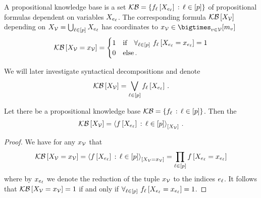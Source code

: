\begin{definition}
    A propositional knowledge base is a set $\mathcal{KB}=\{f_{\ell}\left[X_{e_{\ell}}\right] \,:\, \ell\in[p]\}$ of propositional formulas dependent on variables $X_{e_{\ell}}$.
    The corresponding formula $\mathcal{KB}\left[X_{\mathcal{V}}\right]$ depending on $X_{\mathcal{V}}=\bigcup_{\ell\in[p]}X_{e_{\ell}}$ has coordinates to $\catindexof{\nodes}\in\bigtimes_{\nodein}\catstatesof{\node}$
    \begin{align*}
        \mathcal{KB}\left[X_{\mathcal{V}}=x_{\mathcal{V}}\right]
        = \begin{cases}
              1 & \text{if}\quad \forall_{\ell\in[p]} \,\, {f_{\ell}\left[X_{e_{\ell}}=x_{e_{\ell}}\right]=1}\\
              0 & \text{else} \, .
        \end{cases}
    \end{align*}
\end{definition}

We will later investigate syntactical decompositions and denote
\begin{align*}
    \mathcal{KB}\left[X_{\mathcal{V}}\right]
    = \bigvee_{\ell\in[p]} f_{\ell}\left[X_{e_{\ell}}\right] \, .
\end{align*}


\begin{theorem}
    Let there be a propositional knowledge base $\mathcal{KB}=\{f_{\ell}\,:\,\ell\in[p]\}$.
    Then the
    \begin{align*}
        \mathcal{KB}\left[X_{\mathcal{V}}\right]
        = \left\langle 
            f\left[X_{e_{\ell}}\right] \,:\, \ell\in[p]
        \right\rangle_{\left[ X_{\mathcal{V}} \right]} \, .
    \end{align*}
\end{theorem}
\begin{proof}
    We have for any $x_{\mathcal{V}}$ that
    \begin{align*}
        \mathcal{KB}\left[X_{\mathcal{V}}=x_{\mathcal{V}}\right]
        = \left\langle 
            f\left[X_{e_{\ell}}\right] \,:\, \ell\in[p]
        \right\rangle_{\left[ X_{\mathcal{V}}=x_{\mathcal{V}} \right]}
        = \prod_{\ell\in[p]} f\left[X_{e_{\ell}}=x_{e_{\ell}}\right]
    \end{align*}
    where by $x_{e_{\ell}}$ we denote the reduction of the tuple $x_{\mathcal{V}}$ to the indices $e_{\ell}$.
    It follows that $\mathcal{KB}\left[X_{\mathcal{V}}=x_{\mathcal{V}}\right]=1$ if and only if $\forall_{\ell\in[p]} \,\, {f_{\ell}\left[X_{e_{\ell}}=x_{e_{\ell}}\right]=1}$.
\end{proof}